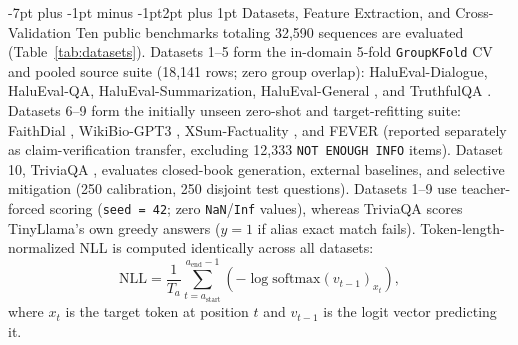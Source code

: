 \documentclass[10pt,twocolumn,letterpaper]{article}
\makeatletter
\renewcommand{\subsection}{\@startsection{subsection}{2}{\z@}%
  {-7pt plus -1pt minus -1pt}{2pt plus 1pt}%
  {\normalfont\normalsize\itshape\color{black}}}
\makeatother
\begin{document}
\subsection{Datasets, Feature Extraction, and Cross-Validation}
Ten public benchmarks totaling 32,590 sequences are evaluated (Table~\ref{tab:datasets}). Datasets 1--5 form the in-domain 5-fold \texttt{GroupKFold} CV and pooled source suite (18,141 rows; zero group overlap): HaluEval-Dialogue, HaluEval-QA, HaluEval-Summarization, HaluEval-General \cite{review29}, and TruthfulQA \cite{review22}. Datasets 6--9 form the initially unseen zero-shot and target-refitting suite: FaithDial \cite{dziri2022faithdial}, WikiBio-GPT3 \cite{review21}, XSum-Factuality \cite{maynez2020faithfulness}, and FEVER \cite{thorne2018fever} (reported separately as claim-verification transfer, excluding 12,333 \texttt{NOT ENOUGH INFO} items). Dataset 10, TriviaQA \cite{joshi2017triviaqa}, evaluates closed-book generation, external baselines, and selective mitigation (250 calibration, 250 disjoint test questions). Datasets 1--9 use teacher-forced scoring (\texttt{seed = 42}; zero \texttt{NaN}/\texttt{Inf} values), whereas TriviaQA scores TinyLlama's own greedy answers ($y = 1$ if alias exact match fails). Token-length-normalized NLL is computed identically across all datasets:
\begin{equation}
\text{NLL} = \frac{1}{T_a} \sum_{t = a_{\text{start}}}^{a_{\text{end}} - 1} \left(-\log \text{softmax}(v_{t-1})_{x_t}\right),
\label{eq:nll}
\end{equation}
where $x_t$ is the target token at position $t$ and $v_{t-1}$ is the logit vector predicting it.
\end{document}
